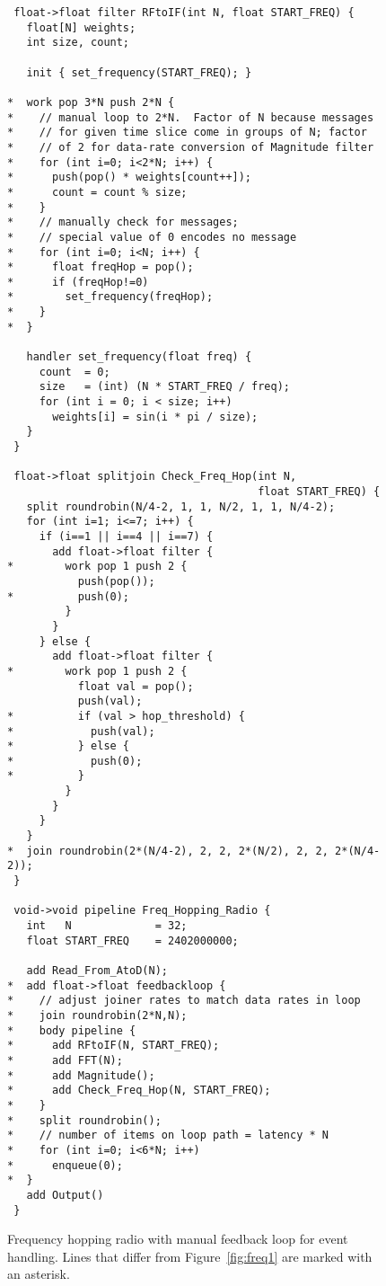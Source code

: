 \begin{figure}[t]
\scriptsize
\begin{verbatim}
 float->float filter RFtoIF(int N, float START_FREQ) {
   float[N] weights;
   int size, count;
   
   init { set_frequency(START_FREQ); }
   
*  work pop 3*N push 2*N {
*    // manual loop to 2*N.  Factor of N because messages 
*    // for given time slice come in groups of N; factor 
*    // of 2 for data-rate conversion of Magnitude filter
*    for (int i=0; i<2*N; i++) {
*      push(pop() * weights[count++]);
*      count = count % size;
*    }
*    // manually check for messages; 
*    // special value of 0 encodes no message
*    for (int i=0; i<N; i++) {
*      float freqHop = pop();
*      if (freqHop!=0)
*        set_frequency(freqHop);
*    }
*  }
   
   handler set_frequency(float freq) {
     count  = 0;
     size   = (int) (N * START_FREQ / freq);
     for (int i = 0; i < size; i++)
       weights[i] = sin(i * pi / size);
   }
 }

 float->float splitjoin Check_Freq_Hop(int N, 
                                       float START_FREQ) {
   split roundrobin(N/4-2, 1, 1, N/2, 1, 1, N/4-2);
   for (int i=1; i<=7; i++) {
     if (i==1 || i==4 || i==7) {
       add float->float filter {
*        work pop 1 push 2 {
           push(pop());
*          push(0);
         }
       }
     } else {
       add float->float filter {
*        work pop 1 push 2 {
           float val = pop();
           push(val);
*          if (val > hop_threshold) {
*            push(val);
*          } else {
*            push(0);
*          }
         }
       }
     }
   }
*  join roundrobin(2*(N/4-2), 2, 2, 2*(N/2), 2, 2, 2*(N/4-2));
 }

 void->void pipeline Freq_Hopping_Radio {
   int   N             = 32;
   float START_FREQ    = 2402000000;
   
   add Read_From_AtoD(N);
*  add float->float feedbackloop {
*    // adjust joiner rates to match data rates in loop
*    join roundrobin(2*N,N);
*    body pipeline {
*      add RFtoIF(N, START_FREQ);
*      add FFT(N);
*      add Magnitude();
*      add Check_Freq_Hop(N, START_FREQ);
*    }
*    split roundrobin();
*    // number of items on loop path = latency * N
*    for (int i=0; i<6*N; i++)
*      enqueue(0);
*  }
   add Output()
 }
\end{verbatim}
\vspace{-12pt}
\caption{\small Frequency hopping radio with manual feedback loop for
event handling.  Lines that differ from Figure~\ref{fig:freq1} are
marked with an asterisk. \protect\label{fig:freq2}}
\end{figure}
\clearpage
